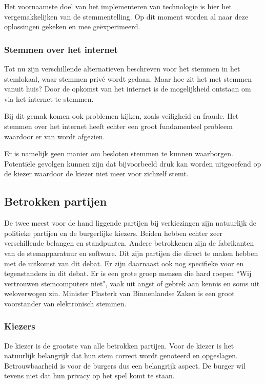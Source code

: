 \documentclass[a4paper]{article}
\newcommand{\TODO}[1]{{\color{red}\textbf{TODO: #1}}}
\renewcommand{\TODO}[1]{}
\begin{document}
Het voornaamste doel van het implementeren van technologie is hier het vergemakkelijken van de stemmentelling.
Op dit moment worden al naar deze oplossingen gekeken en mee ge{\"e}xperimeerd.

\subsubsection{Stemmen over het internet}
Tot nu zijn verschillende alternatieven beschreven voor het stemmen in het stemlokaal, waar stemmen priv{\'e} wordt gedaan. 
Maar hoe zit het met stemmen vanuit huis?
Door de opkomst van het internet is de mogelijkheid ontstaan om via het internet te stemmen.

Bij dit gemak komen ook problemen kijken, zoals veiligheid en fraude. 
Het stemmen over het internet heeft echter een groot fundamenteel probleem waardoor er van wordt afgezien.

Er is namelijk geen manier om besloten stemmen te kunnen waarborgen.
Potenti{\"e}le gevolgen kunnen zijn dat bijvoorbeeld druk kan worden uitgeoefend op de kiezer waardoor de kiezer niet meer voor zichzelf stemt.

\subsection{Betrokken partijen}
De twee meest voor de hand liggende partijen bij verkiezingen zijn natuurlijk de politieke partijen en de burgerlijke kiezers. 
Beiden hebben echter zeer verschillende belangen en standpunten. 
Andere betrokkenen zijn de fabrikanten van de stemapparatuur en software.
Dit zijn partijen die direct te maken hebben met de uitkomst van dit debat.
Er zijn daarnaast ook nog specifieke voor en tegenstanders in dit debat.
Er is een grote groep mensen die hard roepen ``Wij vertrouwen stemcomputers niet", vaak uit angst of gebrek aan kennis en soms uit weloverwogen zin.
Minister Plasterk van Binnenlandse Zaken is een groot voorstander van elektronisch stemmen.

\TODO{plasterk, in welke vorm elektronisch stemmen?}
\TODO{Ervaringen in het buitenland.}

\subsubsection{Kiezers}
De kiezer is de grootste van alle betrokken partijen.
Voor de kiezer is het natuurlijk belangrijk dat hun stem correct wordt genoteerd en opgeslagen. 
Betrouwbaarheid is voor de burgers dus een belangrijk aspect.
De burger wil tevens niet dat hun privacy op het spel komt te staan.
\TODO{Referentie naar iets waaruit blijkt dat een burger het wettelijke recht heeft om zijn of haar stemkeuze geheim te houden?}
\TODO{hoe komt privacy op het spel te staan.}
\end{document}
